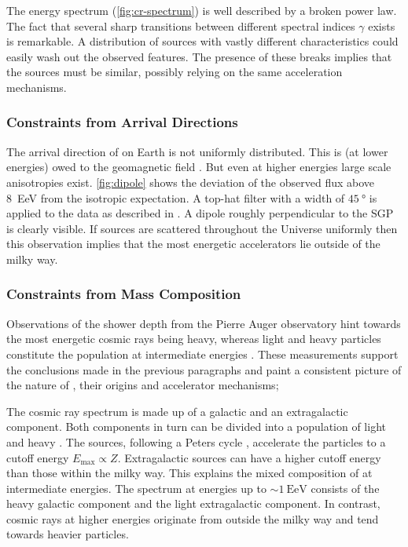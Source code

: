 The \CR energy spectrum (\cref{fig:cr-spectrum}) is well described by a broken
power law. The fact that several sharp transitions between different spectral
indices $\gamma$ exists is remarkable. A distribution of \CR sources with 
vastly different characteristics could easily wash out the observed features. 
The presence of these breaks implies that the sources must be similar, possibly
relying on the same acceleration mechanisms.

\subsubsection{Constraints from Arrival Directions}

The arrival direction of \CRs on Earth is not uniformly distributed. This is 
(at lower energies) owed to the geomagnetic field 
\cite{barberEastWestAsymmetryLatitude1949}. But even at higher energies large 
scale anisotropies exist. \cref{fig:dipole} shows the deviation of the observed
\CR flux above \SI{8}{\exa\eV} from the isotropic expectation. A top-hat filter 
with a width of $\SI{45}{\degree}$ is applied to the data as described in 
\cite{thepierreaugercollaborationObservationLargescaleAnisotropy2017}. A dipole
roughly perpendicular to the \acf{SGP} is clearly visible. If \CR sources are 
scattered throughout the Universe uniformly then this observation implies that 
the most energetic \CR accelerators lie outside of the milky way.

\subsubsection{Constraints from Mass Composition}

Observations of the shower depth from the Pierre Auger observatory hint towards
the most energetic cosmic rays being heavy, whereas light and heavy particles 
constitute the \CR population at intermediate energies 
\cite{mayotteMeasurementInterpretationUHECR2025}. These measurements support 
the conclusions made in the previous paragraphs and paint a consistent picture 
of the nature of \CRs, their origins and accelerator mechanisms;

The cosmic ray spectrum is made up of a galactic and an extragalactic 
component. Both components in turn can be divided into a population of light 
and heavy \CRs. The sources, following a Peters cycle 
\cite{petersPrimaryCosmicRadiation1961}, accelerate the particles to a cutoff
energy $E_\mathrm{max}\propto Z$. Extragalactic sources can have a higher
cutoff energy than those within the milky way. This explains the mixed 
composition of \CRs at intermediate energies. The \CR spectrum at energies up 
to $\sim\SI{1}{\exa\eV}$ consists of the heavy galactic component and the light
extragalactic component. In contrast, cosmic rays at higher energies originate
from outside the milky way and tend towards heavier particles.

